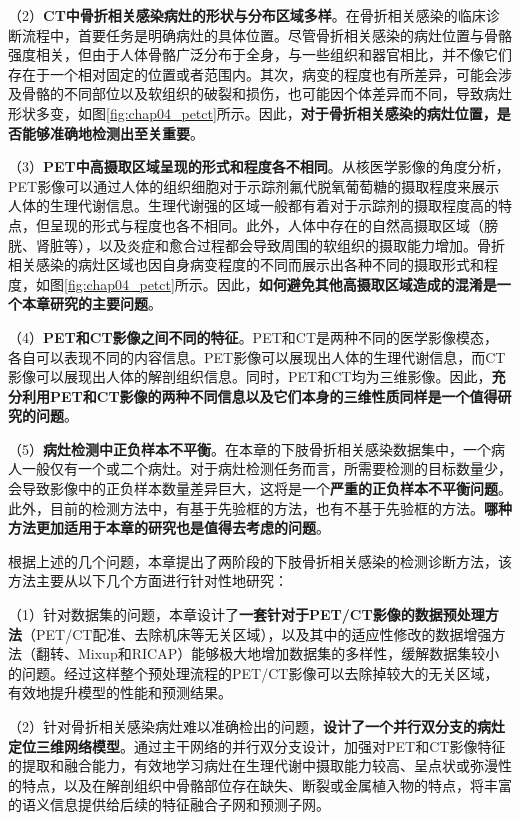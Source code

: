 （2）\textbf{CT中骨折相关感染病灶的形状与分布区域多样}。在骨折相关感染的临床诊断流程中，首要任务是明确病灶的具体位置。尽管骨折相关感染的病灶位置与骨骼强度相关，但由于人体骨骼广泛分布于全身，与一些组织和器官相比，并不像它们存在于一个相对固定的位置或者范围内。其次，病变的程度也有所差异，可能会涉及骨骼的不同部位以及软组织的破裂和损伤，也可能因个体差异而不同，导致病灶形状多变，如图\ref{fig:chap04_petct}所示。因此，\textbf{对于骨折相关感染的病灶位置，是否能够准确地检测出至关重要}。

（3）\textbf{PET中高摄取区域呈现的形式和程度各不相同}。从核医学影像的角度分析，PET影像可以通过人体的组织细胞对于示踪剂氟代脱氧葡萄糖的摄取程度来展示人体的生理代谢信息。生理代谢强的区域一般都有着对于示踪剂的摄取程度高的特点，但呈现的形式与程度也各不相同。此外，人体中存在的自然高摄取区域（膀胱、肾脏等），以及炎症和愈合过程都会导致周围的软组织的摄取能力增加。骨折相关感染的病灶区域也因自身病变程度的不同而展示出各种不同的摄取形式和程度，如图\ref{fig:chap04_petct}所示。因此，\textbf{如何避免其他高摄取区域造成的混淆是一个本章研究的主要问题}。

（4）\textbf{PET和CT影像之间不同的特征}。PET和CT是两种不同的医学影像模态，各自可以表现不同的内容信息。PET影像可以展现出人体的生理代谢信息，而CT影像可以展现出人体的解剖组织信息。同时，PET和CT均为三维影像。因此，\textbf{充分利用PET和CT影像的两种不同信息以及它们本身的三维性质同样是一个值得研究的问题}。

（5）\textbf{病灶检测中正负样本不平衡}。在本章的下肢骨折相关感染数据集中，一个病人一般仅有一个或二个病灶。对于病灶检测任务而言，所需要检测的目标数量少，会导致影像中的正负样本数量差异巨大，这将是一个\textbf{严重的正负样本不平衡问题}。此外，目前的检测方法中，有基于先验框的方法，也有不基于先验框的方法。\textbf{哪种方法更加适用于本章的研究也是值得去考虑的问题}。

根据上述的几个问题，本章提出了两阶段的下肢骨折相关感染的检测诊断方法，该方法主要从以下几个方面进行针对性地研究：

（1）针对数据集的问题，本章设计了\textbf{一套针对于PET/CT影像的数据预处理方法}（PET/CT配准、去除机床等无关区域），以及其中的适应性修改的数据增强方法（翻转、Mixup\cite{zhang2017mixup}和RICAP\cite{takahashi2018ricap}）能够极大地增加数据集的多样性，缓解数据集较小的问题。经过这样整个预处理流程的PET/CT影像可以去除掉较大的无关区域，有效地提升模型的性能和预测结果。

（2）针对骨折相关感染病灶难以准确检出的问题，\textbf{设计了一个并行双分支的病灶定位三维网络模型}。通过主干网络的并行双分支设计，加强对PET和CT影像特征的提取和融合能力，有效地学习病灶在生理代谢中摄取能力较高、呈点状或弥漫性的特点，以及在解剖组织中骨骼部位存在缺失、断裂或金属植入物的特点，将丰富的语义信息提供给后续的特征融合子网和预测子网。

